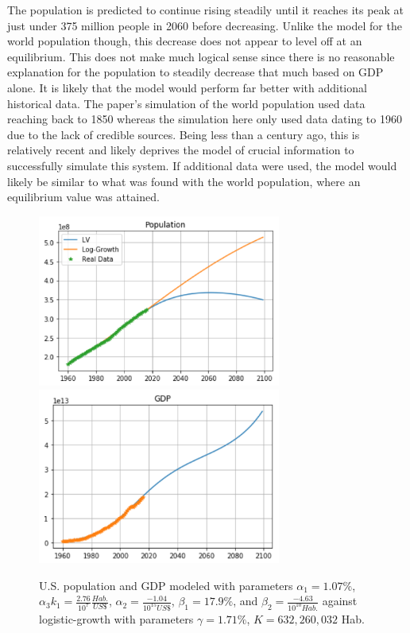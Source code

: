 \documentclass[a4paper]{article}
\begin{document}
The population is predicted to continue rising steadily until it reaches its peak at just under 375 million people in 2060 before decreasing. Unlike the model for the world population though, this decrease does not appear to level off at an equilibrium. This does not make much logical sense since there is no reasonable explanation for the population to steadily decrease that much based on GDP alone. It is likely that the model would perform far better with additional historical data. The paper's simulation of the world population used data reaching back to 1850 whereas the simulation here only used data dating to 1960 due to the lack of credible sources. Being less than a century ago, this is relatively recent and likely deprives the model of crucial information to successfully simulate this system. If additional data were used, the model would likely be similar to what was found with the world population, where an equilibrium value was attained.

\begin{figure}[t]
\includegraphics[width=80mm]{images/us-pop.png}
\includegraphics[width=80mm]{images/us-gdp.png}
\caption{U.S. population and GDP modeled with parameters   $\alpha_1 = 1.07\%$, $\alpha_3 k_1 = \frac{2.76}{10^{7}}\frac{Hab.}{US \$}$, $\alpha_2 = \frac{-1.04}{10^{15} US\$}$, $\beta_1 = 17.9\%$, and $\beta_2 = \frac{-4.63}{10^{10} Hab.}$ against logistic-growth with parameters  $\gamma = 1.71\%$, $K = 632,260,032$ Hab.\label{overflow}}
\end{figure}
\end{document}

